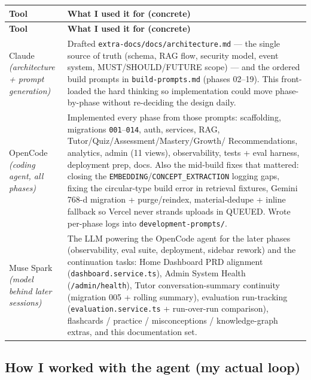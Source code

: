 \documentclass[11pt,a4paper]{article}
\begin{document}
\begin{longtable}{p{3.4cm}p{11.6cm}}
\toprule
\textbf{Tool} & \textbf{What I used it for (concrete)} \\
\midrule
\endfirsthead
\toprule
\textbf{Tool} & \textbf{What I used it for (concrete)} \\
\midrule
\endhead
Claude \textit{(architecture + prompt generation)} &
Drafted \texttt{extra-docs/docs/architecture.md} --- the single source of truth
(schema, RAG flow, security model, event system, MUST/SHOULD/FUTURE scope) ---
and the ordered build prompts in \texttt{build-prompts.md} (phases 02--19).
This front-loaded the hard thinking so implementation could move phase-by-phase
without re-deciding the design daily. \\
\midrule
OpenCode \textit{(coding agent, all phases)} &
Implemented every phase from those prompts: scaffolding, migrations
\texttt{001}--\texttt{014}, auth, services, RAG, Tutor/Quiz/Assessment/Mastery/Growth/
Recommendations, analytics, admin (11 views), observability, tests + eval harness,
deployment prep, docs. Also the mid-build fixes that mattered: closing the
\texttt{EMBEDDING}/\texttt{CONCEPT\_EXTRACTION} logging gaps, fixing the circular-type
build error in retrieval fixtures, Gemini 768-d migration + purge/reindex,
material-dedupe + inline fallback so Vercel never strands uploads in QUEUED.
Wrote per-phase logs into \texttt{development-prompts/}. \\
\midrule
Muse Spark \textit{(model behind later sessions)} &
The LLM powering the OpenCode agent for the later phases (observability, eval suite,
deployment, sidebar rework) and the continuation tasks: Home Dashboard PRD alignment
(\texttt{dashboard.service.ts}), Admin System Health (\texttt{/admin/health}),
Tutor conversation-summary continuity (migration 005 + rolling summary), evaluation
run-tracking (\texttt{evaluation.service.ts} + run-over-run comparison), flashcards /
practice / misconceptions / knowledge-graph extras, and this documentation set. \\
\bottomrule
\end{longtable}

\subsection{How I worked with the agent (my actual loop)}
\end{document}
